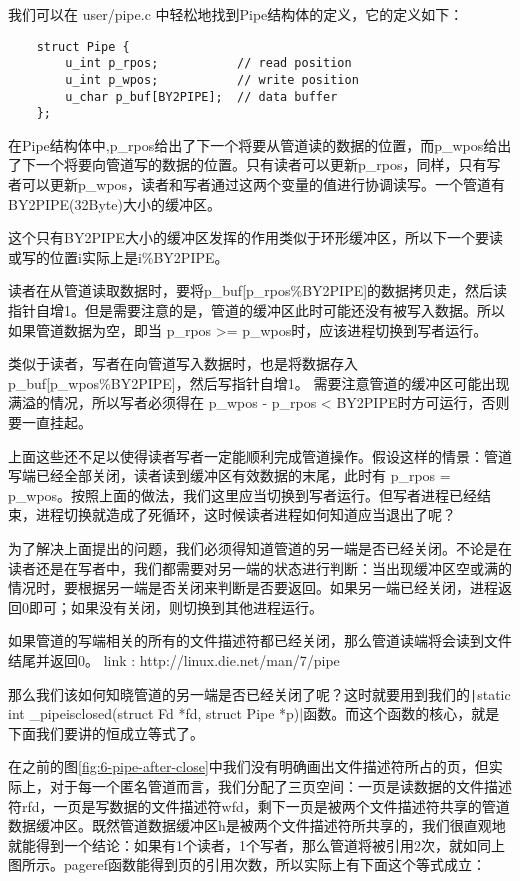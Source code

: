 我们可以在 user/pipe.c 中轻松地找到Pipe结构体的定义，它的定义如下：

\begin{verbatim}
	struct Pipe {
		u_int p_rpos;		    // read position
		u_int p_wpos;		    // write position
		u_char p_buf[BY2PIPE];	// data buffer
	};
\end{verbatim}

在Pipe结构体中,p\_rpos给出了下一个将要从管道读的数据的位置，而p\_wpos给出了下一个将要向管道写的数据的位置。只有读者可以更新p\_rpos，同样，只有写者可以更新p\_wpos，读者和写者通过这两个变量的值进行协调读写。一个管道有BY2PIPE(32Byte)大小的缓冲区。

这个只有BY2PIPE大小的缓冲区发挥的作用类似于环形缓冲区，所以下一个要读或写的位置i实际上是i\%BY2PIPE。

读者在从管道读取数据时，要将p\_buf[p\_rpos\%BY2PIPE]的数据拷贝走，然后读指针自增1。但是需要注意的是，管道的缓冲区此时可能还没有被写入数据。所以如果管道数据为空，即当 p\_rpos >= p\_wpos时，应该进程切换到写者运行。

类似于读者，写者在向管道写入数据时，也是将数据存入p\_buf[p\_wpos\%BY2PIPE]，然后写指针自增1。 需要注意管道的缓冲区可能出现满溢的情况，所以写者必须得在 p\_wpos - p\_rpos < BY2PIPE时方可运行，否则要一直挂起。

上面这些还不足以使得读者写者一定能顺利完成管道操作。假设这样的情景：管道写端已经全部关闭，读者读到缓冲区有效数据的末尾，此时有 p\_rpos = p\_wpos。按照上面的做法，我们这里应当切换到写者运行。但写者进程已经结束，进程切换就造成了死循环，这时候读者进程如何知道应当退出了呢？

为了解决上面提出的问题，我们必须得知道管道的另一端是否已经关闭。不论是在读者还是在写者中，我们都需要对另一端的状态进行判断：当出现缓冲区空或满的情况时，要根据另一端是否关闭来判断是否要返回。如果另一端已经关闭，进程返回0即可；如果没有关闭，则切换到其他进程运行。

\begin{note}
如果管道的写端相关的所有的文件描述符都已经关闭，那么管道读端将会读到文件结尾并返回0。 link : http://linux.die.net/man/7/pipe
\end{note}

那么我们该如何知晓管道的另一端是否已经关闭了呢？这时就要用到我们的\texttt|static int _pipeisclosed(struct Fd *fd, struct Pipe *p)|函数。而这个函数的核心，就是下面我们要讲的恒成立等式了。

在之前的图\ref{fig:6-pipe-after-close}中我们没有明确画出文件描述符所占的页，但实际上，对于每一个匿名管道而言，我们分配了三页空间：一页是读数据的文件描述符rfd，一页是写数据的文件描述符wfd，剩下一页是被两个文件描述符共享的管道数据缓冲区。既然管道数据缓冲区h是被两个文件描述符所共享的，我们很直观地就能得到一个结论：如果有1个读者，1个写者，那么管道将被引用2次，就如同上图所示。pageref函数能得到页的引用次数，所以实际上有下面这个等式成立：

